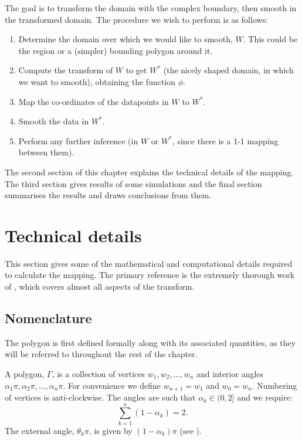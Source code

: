 The goal is to transform the domain with the complex boundary, then smooth in the transformed domain. The procedure we wish to perform is as follows:

\begin{enumerate}
\item Determine the domain over which we would like to smooth, $W$. This could be the region or a (simpler) bounding polygon around it.

\item Compute the \sch transform of $W$ to get $W^*$ (the nicely shaped domain, in which we want to smooth), obtaining the function $\phi$.

\item Map the co-ordinates of the datapoints in $W$ to $W^*$.

\item Smooth the data in $W^*$.

\item Perform any further inference (in $W$ or $W^*$, since there is a 1-1 mapping between them).
\end{enumerate}

The second section of this chapter explains the technical details of the mapping. The third section gives results of some simulations and the final section summarises the results and draws conclusions from them.

\section{Technical details}

This section gives some of the mathematical and computational details required to calculate the \sch mapping. The primary reference is the extremely thorough work of \cite{driscoll}, which covers almost all aspects of the \sch transform.

\subsection{Nomenclature}

The polygon is first defined formally along with its associated quantities, as they will be referred to throughout the rest of the chapter.

A polygon, $\Gamma$, is a collection of vertices $w_1, w_2,\dots,w_n$ and interior angles $\alpha_1\pi, \alpha_2\pi, \dots, \alpha_n\pi$. For convenience we define $w_{n+1} = w_1$ and $w_0=w_n$. Numbering of vertices is anti-clockwise. The angles are such that $\alpha_k \in (0,2]$ and we require:
\begin{equation}
\sum_{k=1}^n (1-\alpha_k) = 2.
\end{equation}
The external angle, $\theta_k\pi$, is given by $(1-\alpha_k)\pi$ (see ).

